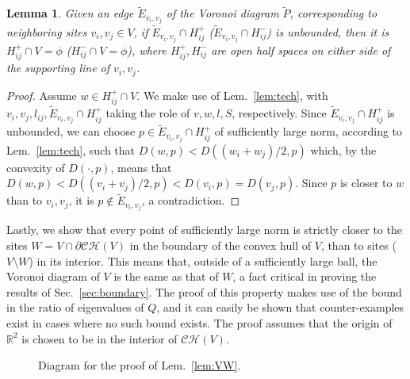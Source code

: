 \documentclass[11pt]{article}
\newtheorem{lemma}[theorem]{Lemma}
\begin{document}
\begin{lemma}\label{lem:halfspace}
    Given an edge $\tilde{E}_{v_i,v_j}$ of the Voronoi diagram $\tilde{P}$, corresponding to neighboring sites $v_i,v_j\in
V$, if $\tilde{E}_{v_i,v_j}\cap  H^{+}_{ij}$ ($\tilde{E}_{v_i,v_j}\cap  H^{-}_{ij}$) is unbounded, then it is $ H^{+}_{ij}\cap V=\phi$
 ($ H^{-}_{ij}\cap V=\phi$), 
where $H^{+}_{ij},H^{-}_{ij}$ are open half spaces on either side of the
supporting line of $v_i,v_j$. 
\end{lemma}
\begin{proof}
Assume $w\in H^{+}_{ij}\cap V$. 
We make use of Lem.~\ref{lem:tech}, with $v_i,v_j,l_{ij},\tilde{E}_{v_i,v_j}\cap H^{+}_{ij}$
taking the role of $v,w,l,S$, respectively. Since $\tilde{E}_{v_i,v_j}\cap H^{+}_{ij}$ is unbounded, 
we can choose $p\in \tilde{E}_{v_i,v_j}\cap H^{+}_{ij}$ of sufficiently large norm, according to
Lem.~\ref{lem:tech}, 
such that $D(w,p) < D((w_i+w_j)/2,p)$ which, 
by the convexity of $D(\cdot,p)$, means that $D(w,p) < D((v_i+v_j)/2,p) <
D(v_i,p)=D(v_j,p)$. 
Since $p$ is closer to $w$ than to $v_i,v_j$, it is $p\notin \tilde{E}_{v_i,v_j}$, a
contradiction. 
\end{proof}



Lastly, we show that every point of sufficiently large norm is strictly closer to
the sites $W=V\cap\partial\mathcal{CH}(V)$ in the boundary of the convex
hull of $V$, than to sites ($V\setminus W$) in its interior. This means that, outside of a sufficiently large ball, the Voronoi 
diagram of $V$ is the same as that of $W$, a fact critical in proving the
results of Sec.~\ref{sec:boundary}. The proof of this property makes use of the
bound in the ratio of eigenvalues of $Q$, and it can easily be shown that
counter-examples exist in cases where no such bound exists. 
The proof assumes that the origin of $\mathbb{R}^2$ is chosen to be in the interior of $\mathcal{CH}(V)$. 


\begin{figure}
\centering
{}
\quad\quad {}
\label{fig:vH}
\caption{Diagram for the proof of Lem.~\ref{lem:VW}.}
\end{figure}
\end{document}
